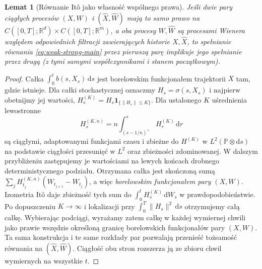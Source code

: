 \documentclass[11pt,a4paper,oneside]{report}
\numberwithin{equation}{chapter}
\theoremstyle{plain}
\newtheorem{lemat}[twierdzenie]{Lemat}
\theoremstyle{definition}
\theoremstyle{remark}
\newcommand{\R}{\mathbb{R}}
\newcommand{\Prob}{\mathbb{P}}
\newcommand{\ind}[1]{\mathbf{1}_{#1}}
\newcommand{\dd}{\mathrm{d}}
\begin{document}
\begin{lemat}[Równanie Itô jako własność wspólnego prawa]\label{lem:volIII:14:02}
\label{lem:YW-transfer}
Jeśli dwie pary ciągłych procesów $(X,W)$ i
$(\widehat X,\widehat W)$ mają to samo prawo na
$C([0,T];\R^d)\times C([0,T];\R^m)$, a oba procesy
$W,\widehat W$ są procesami Wienera względem odpowiednich
filtracji zawierających historie $X,\widehat X$, to
spełnianie równania \eqref{eq:weak-strong-main} przez
pierwszą parę implikuje jego spełnianie przez drugą
(z tymi samymi współczynnikami i stanem początkowym).
\end{lemat}
\begin{proof}
Całka $\int_0^t b(s,X_s)\,\dd s$ jest borelowskim
funkcjonałem trajektorii $X$ tam, gdzie istnieje.
Dla całki stochastycznej oznaczmy
$H_s=\sigma(s,X_s)$ i najpierw obetnijmy jej wartości,
$H_s^{(K)}=H_s\ind{\{\|H_s\|\le K\}}$.
Dla ustalonego $K$ uśrednienia lewostronne
\[
 H_s^{(K,n)}=n\int_{(s-1/n)^+}^{s}H_r^{(K)}\,\dd r
\]
są ciągłymi, adaptowanymi funkcjami czasu i zbieżne do
$H^{(K)}$ w $L^2(\Prob\otimes\dd s)$ na podstawie
ciągłości przesunięć w $L^2$ oraz zbieżności zdominowanej.
W dalszym przybliżeniu zastępujemy je wartościami na
lewych końcach drobnego deterministycznego podziału.
Otrzymana całka jest skończoną sumą
$\sum_j H_{t_j}^{(K,n)}(W_{t_{j+1}}-W_{t_j})$,
a więc \emph{borelowskim funkcjonałem pary} $(X,W)$.
Izometria Itô daje zbieżność tych sum do
$\int_0^tH_s^{(K)}\,\dd W_s$ w prawdopodobieństwie.
Po dopuszczeniu $K\to\infty$ i lokalizacji przy
$\int_0^T\|H_s\|^2\,\dd s$ otrzymujemy całą całkę.
Wybierając podciągi, wyrażamy zatem całkę w każdej
wymiernej chwili jako prawie wszędzie określoną granicę
borelowskich funkcjonałów pary $(X,W)$.
Ta sama konstrukcja i te same rozkłady par pozwalają
przenieść tożsamość równania na $(\widehat X,\widehat W)$.
Ciągłość obu stron rozszerza ją ze zbioru chwil wymiernych
na wszystkie $t$.
\end{proof}
\end{document}
